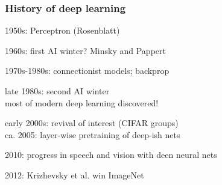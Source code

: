 \documentclass[xcolor=dvipsnames]{beamer}
\begin{document}
\begin{frame}
  \frametitle{History of deep learning}
  \bi
\item 1950s: Perceptron (Rosenblatt)
\item 1960s: first AI winter? Minsky and Pappert
\item 1970s-1980s: connectionist models; backprop
\item late 1980s: second AI winter\\
most of modern deep learning discovered!
\item early 2000s: revival of interest (CIFAR groups)\\
ca. 2005: layer-wise pretraining of deep-ish nets
\item 2010: progress in speech and vision with deen neural nets
\item 2012: Krizhevsky et al. win ImageNet
\ei
\end{frame}
\end{document}
